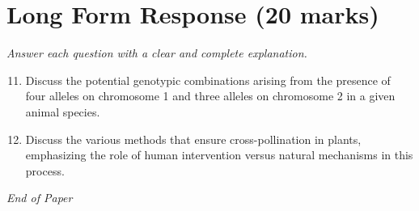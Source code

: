 \documentclass[12pt]{article}
\begin{document}
\section*{Long Form Response (20 marks)}
\textit{Answer each question with a clear and complete explanation.}
\begin{enumerate}[label=\arabic*.]
\setcounter{enumi}{10}
\item Discuss the potential genotypic combinations arising from the presence of four alleles on chromosome 1 and three alleles on chromosome 2 in a given animal species.
\item Discuss the various methods that ensure cross-pollination in plants, emphasizing the role of human intervention versus natural mechanisms in this process.
\end{enumerate}

\vfill
\noindent\textit{End of Paper}
\end{document}
